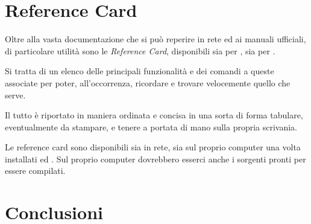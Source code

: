 \documentclass[10pt,a4paper]{article}
\begin{document}

\section{Reference Card}
\label{sec:refcard}

Oltre alla vasta documentazione che si può reperire in rete ed ai
manuali ufficiali, di particolare utilità sono le \emph{Reference
  Card}, disponibili sia per \emacs{}, sia per \auctex{}.

Si tratta di un elenco delle principali funzionalità e dei comandi 
a queste associate per poter, all'occorrenza, ricordare e trovare
velocemente quello che serve.

Il tutto è riportato in maniera ordinata e concisa in una sorta di
forma tabulare, eventualmente  da stampare, e tenere a portata di mano
sulla propria scrivania.

Le reference card sono disponibili sia in rete, sia sul proprio
computer una volta installati \emacs{} ed \auctex. Sul proprio
computer dovrebbero esserci anche i sorgenti pronti per essere compilati.

\section{Conclusioni}
\label{sec:fine}

\textcolor{red!50}{\lipsum[1]}


\end{document}
